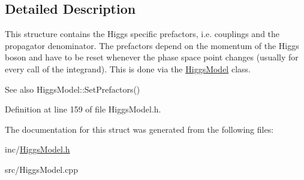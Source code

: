 \subsection{Detailed Description}
This structure contains the Higgs specific prefactors, i.\+e. couplings and the propagator denominator. The prefactors depend on the momentum of the Higgs boson and have to be reset whenever the phase space point changes (usually for every call of the integrand). This is done via the \hyperlink{classHiggsModel}{Higgs\+Model} class. \begin{DoxySeeAlso}{See also}
Higgs\+Model\+::\+Set\+Prefactors() 
\end{DoxySeeAlso}


Definition at line 159 of file Higgs\+Model.\+h.



The documentation for this struct was generated from the following files\+:\begin{DoxyCompactItemize}
\item 
inc/\hyperlink{HiggsModel_8h}{Higgs\+Model.\+h}\item 
src/Higgs\+Model.\+cpp\end{DoxyCompactItemize}
